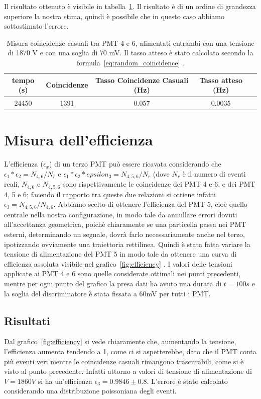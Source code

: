 \documentclass[a4paper,10pt]{article}
\begin{document}
Il risultato ottenuto è visibile in tabella~\ref{tab:random_coincidence_mesured}. Il risultato è di un ordine di grandezza superiore la nostra stima, quindi è possibile che in questo caso abbiamo sottostimato l'errore. 

\begin{table}
\centering
\begin{tabular}{|c|c|c|c|c|}
\hline 
tempo (s) & Coincidenze & Tasso Coincidenze Casuali (Hz) & Tasso atteso (Hz) \\ 
\hline 
24450 & 1391 & 0.057 & 0.0035\\ 
\hline 
\end{tabular} 
\caption{Misura coincidenze casuali tra PMT 4 e 6, alimentati entrambi con una tensione di 1870 V e con una soglia di 70 mV. Il tasso atteso è stato calcolato secondo la formula~\ref{eq:random_coincidence} .}
\label{tab:random_coincidence_mesured}
\end{table}

\section{Misura dell'efficienza}
L'efficienza ($\epsilon_x$) di un terzo PMT può essere ricavata considerando che $\epsilon_1*\epsilon_2=N_{4,6}/N_r$ e $\epsilon_1*\epsilon_2*epsilon_3=N_{4,5,6}/N_r$ (dove $N_r$ è il numero di eventi reali, $N_{4,6}$ e $N_{4,5,6}$ sono rispettivamente le coincidenze dei PMT 4 e 6, e dei PMT 4, 5 e 6; facendo il rapporto tra queste due relazioni si ottiene infatti $\epsilon_3=N_{4,5,6}/N_{4,6}$. Abbiamo scelto di ottenere l'efficienza del PMT 5, cioè quello centrale nella nostra configurazione, in modo tale da annullare errori dovuti all'accettanza geometrica, poichè chiaramente se una particella passa nei PMT esterni, determinando un segnale, dovrà farlo necessariamente anche nel terzo, ipotizzando ovviamente una traiettoria rettilinea. Quindi è stata fatta variare la tensione di alimentazione del PMT 5 in modo tale da ottenere una curva di efficienza assoluta visibile nel grafico~\ref{fig:efficiency} .
I valori delle tensioni applicate ai PMT 4 e 6 sono quelle considerate ottimali nei punti precedenti, mentre per ogni punto del grafico la presa dati ha avuto una durata di $t=100s$ e la soglia del discriminatore è stata fissata a 60mV per tutti i PMT.
\subsection{Risultati}
Dal grafico~\ref{fig:efficiency} si vede chiaramente che, aumentando la tensione, l'efficienza aumenta tendendo a 1, come ci si aspetterebbe, dato che il PMT conta più eventi veri mentre le coincidenze casuali rimangono trascurabili, come si è visto al punto precedente. Infatti attorno a valori di tensione di alimentazione di $V=1860V$ si ha un'efficienza $\epsilon_3=0.9846\pm0.8$. L'errore è stato calcolato considerando una distribuzione poissoniana degli eventi.
\end{document}

